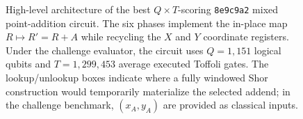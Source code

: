 \begin{figure}[!t]
{{%
    }%
  }
  \caption{High-level architecture of the best $Q\times T$-scoring
  \texttt{8e9c9a2} mixed point-addition circuit. The six phases implement the
  in-place map $R\mapsto R'=R+A$ while recycling the $X$ and $Y$ coordinate
  registers. Under the challenge evaluator, the circuit uses $Q=1{,}151$
  logical qubits and $T=1{,}299{,}453$ average executed Toffoli gates. The
  lookup/unlookup boxes indicate where a fully windowed Shor construction
  would temporarily materialize the selected addend; in the challenge
  benchmark, $(x_A,y_A)$ are provided as classical inputs.}
  \label{fig:best-qxt-circuit-pipeline}
\end{figure}
